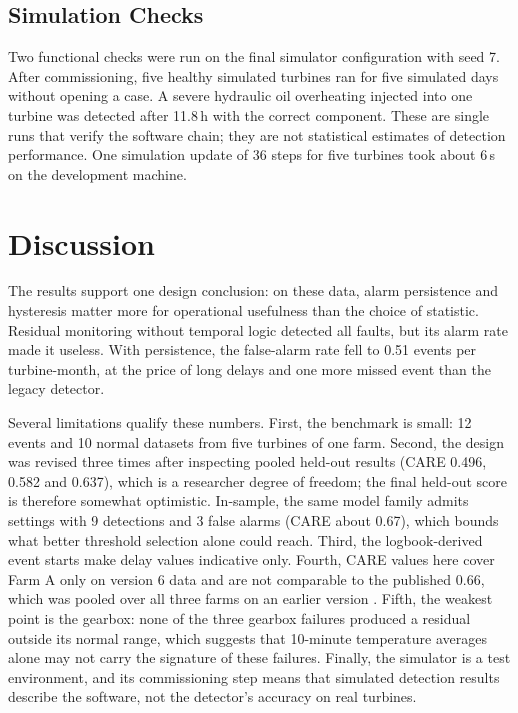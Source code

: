\documentclass[conference]{IEEEtran}
\begin{document}
\subsection{Simulation Checks}
Two functional checks were run on the final simulator configuration with seed 7. After commissioning, five healthy simulated turbines ran for five simulated days without opening a case. A severe hydraulic oil overheating injected into one turbine was detected after 11.8\,h with the correct component. These are single runs that verify the software chain; they are not statistical estimates of detection performance. One simulation update of 36 steps for five turbines took about 6\,s on the development machine.

\section{Discussion}
The results support one design conclusion: on these data, alarm persistence and hysteresis matter more for operational usefulness than the choice of statistic. Residual monitoring without temporal logic detected all faults, but its alarm rate made it useless. With persistence, the false-alarm rate fell to 0.51 events per turbine-month, at the price of long delays and one more missed event than the legacy detector.

Several limitations qualify these numbers. First, the benchmark is small: 12 events and 10 normal datasets from five turbines of one farm. Second, the design was revised three times after inspecting pooled held-out results (CARE 0.496, 0.582 and 0.637), which is a researcher degree of freedom; the final held-out score is therefore somewhat optimistic. In-sample, the same model family admits settings with 9 detections and 3 false alarms (CARE about 0.67), which bounds what better threshold selection alone could reach. Third, the logbook-derived event starts make delay values indicative only. Fourth, CARE values here cover Farm A only on version 6 data and are not comparable to the published 0.66, which was pooled over all three farms on an earlier version \cite{gueck2024care}. Fifth, the weakest point is the gearbox: none of the three gearbox failures produced a residual outside its normal range, which suggests that 10-minute temperature averages alone may not carry the signature of these failures. Finally, the simulator is a test environment, and its commissioning step means that simulated detection results describe the software, not the detector's accuracy on real turbines.
\end{document}
